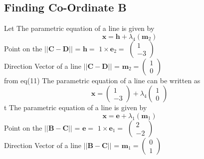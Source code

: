 \documentclass[journal,10pt,twocolumn]{article}
\let\vec\mathbf
\newcommand{\myvec}[1]{\ensuremath{\begin{pmatrix}#1\end{pmatrix}}}
\begin{document}
\begin{flushleft}
\subsection{Finding Co-Ordinate B}
Let The parametric equation of a line is given by
\begin{equation}
 \boldsymbol{x} = \vec{h}+\lambda_4(\vec{m}_2)   
\end{equation}
Point on the $||\vec{C-D}||$ = 
\begin{math}
\vec{h} =
\end{math}
\begin{math}
1 \times \vec{e}_2 =
\end{math}
\begin{math}
\myvec{1 \\ -3}
\end{math}
\vspace{0.3cm}\\
Direction Vector of a line  $||\vec{C-D}||$ = 
\begin{math}
\vec{m}_2 = \myvec{1 \\ 0}
\end{math}
\vspace{0.3cm}\\
from eq(11) The parametric equation of a line can be written as
\begin{equation}
     \boldsymbol{x} = \myvec{1 \\ -3} + \lambda_4\myvec{1 \\ 0}
\end{equation}
t The parametric equation of a line is given by
\begin{equation}
 \boldsymbol{x} = \vec{e}+\lambda_1(\vec{m}_1)   
\end{equation}
Point on the $||\vec{B-C}||$ = 
\begin{math}
\vec{e} =
\end{math}
\begin{math}
1 \times \vec{e}_1 =
\end{math}
\begin{math}
\myvec{2 \\ -2}
\end{math}
\vspace{0.3cm}\\
Direction Vector of a line  $||\vec{B-C}||$ = 
\begin{math}
\vec{m}_1 = \myvec{0 \\ 1}
\end{math}
\vspace{0.3cm}\\

\end{flushleft}
\end{document}
